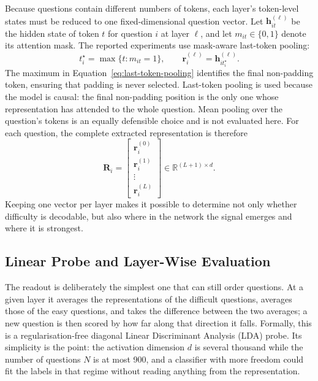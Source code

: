 Because questions contain different numbers of tokens, each layer's token-level
states must be reduced to one fixed-dimensional question vector. Let
\(\mathbf{h}^{(\ell)}_{it}\) be the hidden state of token \(t\) for question
\(i\) at layer \(\ell\), and let \(m_{it}\in\{0,1\}\) denote its attention mask.
The reported experiments use mask-aware last-token pooling:
\begin{equation}
  t_i^{\star}=\max\{t:m_{it}=1\},
  \qquad
  \mathbf{r}^{(\ell)}_i=\mathbf{h}^{(\ell)}_{i t_i^{\star}}.
  \label{eq:last-token-pooling}
\end{equation}
The maximum in Equation~\eqref{eq:last-token-pooling} identifies the final
non-padding token, ensuring that padding is never selected. Last-token pooling
is used because the model is causal: the final non-padding position is the only
one whose representation has attended to the whole question. Mean pooling over
the question's tokens is an equally defensible choice and is not evaluated
here.
For each question, the complete extracted representation is therefore
\begin{equation}
  \mathbf{R}_i=
  \begin{bmatrix}
    \mathbf{r}^{(0)}_i\\
    \mathbf{r}^{(1)}_i\\
    \vdots\\
    \mathbf{r}^{(L)}_i
  \end{bmatrix}
  \in\mathbb{R}^{(L+1)\times d}.
  \label{eq:layer-representation-matrix}
\end{equation}
Keeping one vector per layer makes it possible to determine not only whether
difficulty is decodable, but also where in the network the signal emerges and
where it is strongest.

\subsection{Linear Probe and Layer-Wise Evaluation}
\label{subsec:linear-layerwise-probe}

The readout is deliberately the simplest one that can still order questions.
At a given layer it averages the representations of the difficult questions,
averages those of the easy questions, and takes the difference between the two
averages; a new question is then scored by how far along that direction it
falls. Formally, this is a regularisation-free diagonal Linear Discriminant
Analysis (LDA) probe. Its simplicity is the point: the activation dimension
\(d\) is several thousand while the number of questions \(N\) is at most
900, and a classifier with more freedom could fit the labels in that regime
without reading anything from the representation.

